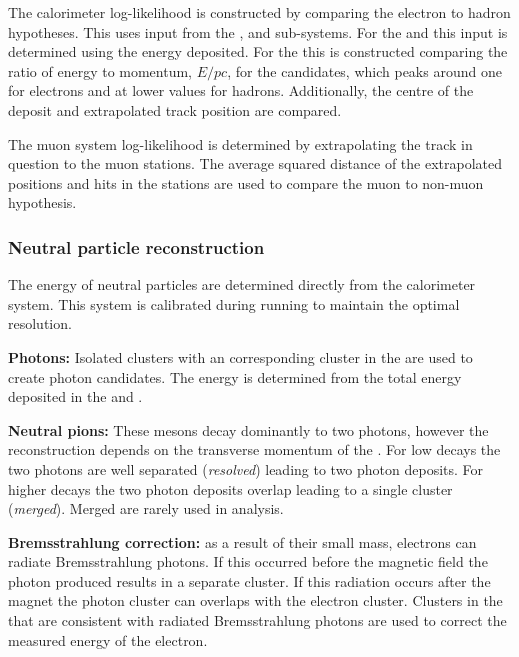 The calorimeter log-likelihood is constructed by comparing the electron to hadron hypotheses. This uses input from the \ecal, \hcal and \presh sub-systems.
For the \hcal and \presh this input is determined using the energy deposited. For the \ecal this is constructed comparing the ratio of energy to momentum, $E/pc$, for the candidates, which peaks around one for electrons and at lower values for hadrons. Additionally, the centre of the \ecal deposit and extrapolated track position are compared.     

The muon system log-likelihood is determined by extrapolating the track in question to the muon stations. The average squared distance of the extrapolated positions and hits in the stations are used to compare the muon to non-muon hypothesis.   

\subsubsection{Neutral particle reconstruction}

The energy of neutral particles are determined directly from the calorimeter system. This system is calibrated during running to maintain the optimal resolution.  

\begin{description}
\item\textbf{Photons:} Isolated \ecal clusters with an corresponding cluster in the \presh are used to create photon candidates. The energy is determined from the total energy deposited in the \ecal and \presh. 
\item \textbf{Neutral pions:} These mesons decay dominantly to two photons, however the reconstruction depends on the transverse momentum of the \piz. For low \pt decays the two photons are well separated (\emph{resolved}) leading to two photon deposits. For higher \pt decays the two photon deposits overlap leading to a single \ecal cluster (\emph{merged}). Merged \piz are rarely used in analysis.
\item \textbf{Bremsstrahlung correction:} as a result of their small mass, electrons can radiate Bremsstrahlung photons. If this occurred before the magnetic field the photon produced results in a separate \ecal cluster. If this radiation occurs after the magnet the photon cluster can overlaps with the electron cluster. Clusters in the \ecal that are consistent with radiated Bremsstrahlung photons are used to correct the measured energy of the electron.
\end{description}




